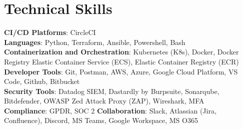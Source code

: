 \documentclass[letterpaper,10pt]{article}
\begin{document}
\section{Technical Skills}
 \begin{itemize}[leftmargin=0.15in, label={}]
    \small{\item{
     \textbf{CI/CD Platforms}{: CircleCI} \\
     \textbf{Languages}{: Python, Terraform, Ansible, Powershell, Bash } \\
     \textbf{Containerization and Orchestration}{: Kubernetes (K8s), Docker, Docker Registry  Elastic Container Service (ECS), Elastic Container Registry (ECR) } \\
     \textbf{Developer Tools}{: Git, Postman, AWS, Azure, Google Cloud Platform, VS Code, Github, Bitbucket } \\
     \textbf{Security Tools}{: Datadog SIEM, Dastardly by Burpsuite, Sonarqube, Bitdefender, OWASP Zed Attack Proxy (ZAP), Wireshark, MFA} \\
     \textbf{Compliance}{: GPDR, SOC 2}
     \textbf{Collaboration}{: Slack, Atlassian (Jira, Confluence), Discord, MS Teams, Google Workspace, MS O365}

    }}
 \end{itemize}


\end{document}
